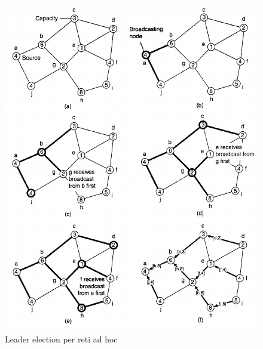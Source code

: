 \documentclass[12pt]{article}
\begin{document}
			\begin{figure}[h!]
				\centering
				\includegraphics[scale=0.40]{img/adhoc.png}
				\caption{Leader election per reti ad hoc}
			\end{figure}
			
\end{document}
